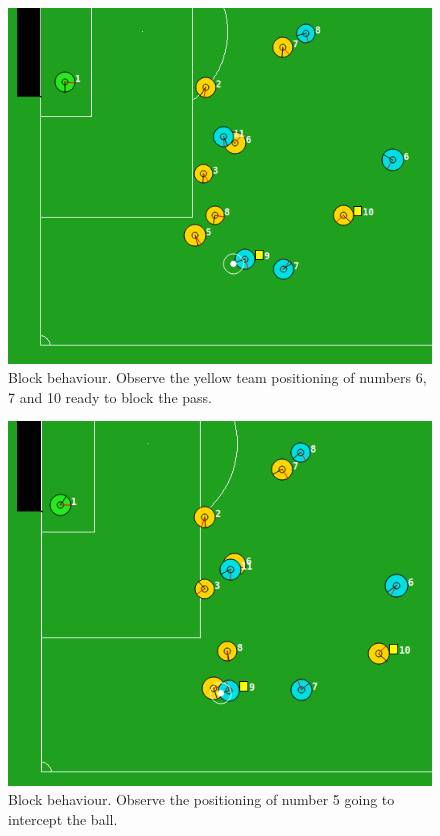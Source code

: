 \begin{figure}[h]
    \centering
    \includegraphics[scale=0.5]{images/block_pass.png}
    \caption{Block behaviour. Observe the yellow team positioning of numbers 6, 7 and 10 ready to block the pass.}
    \label{fig:block}
\end{figure}

\begin{figure}[H]
    \centering
    \includegraphics[scale=0.5]{images/marlik_block.png}
    \caption{Block behaviour. Observe the positioning of number 5 going to intercept the ball.}
    \label{fig:block2}
\end{figure}


